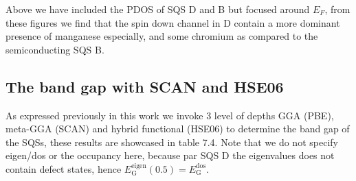 Above we have included the PDOS of SQS D and B but focused around $E_F$, from these figures we find that the spin down channel in D contain a more dominant presence of manganese especially, and some chromium as compared to the semiconducting SQS B.  

\subsection{The band gap with SCAN and HSE06}
As expressed previously in this work we invoke 3 level of depths GGA (PBE), meta-GGA (SCAN) and hybrid functional (HSE06) to determine the band gap of the SQSs, these results are showcased in table 7.4. Note that we do not specify eigen/dos or the occupancy here, because par SQS D the eigenvalues does not contain defect states, hence $E_\text{G} ^\text{eigen}(0.5) = E_\text{G} ^\text{dos}$.

